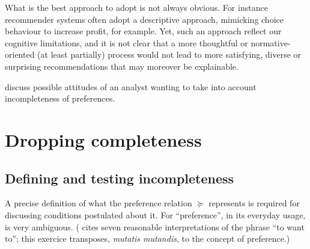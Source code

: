 \documentclass[french, english]{llncs}
\begin{document}
	What is the best approach to adopt is not always obvious. For instance recommender systems often adopt a descriptive approach, mimicking choice behaviour to increase profit, for example. Yet, such an approach reflect our cognitive limitations, and it is not clear that a more thoughtful or normative-oriented (at least partially) process would not lead to more satisfying, diverse or surprising recommendations that may moreover be explainable.
	
	
	\citet{fischhoff_knowing_1980} \citep[also]{fischhoff_knowing_1988} discuss possible attitudes of an analyst wanting to take into account incompleteness of preferences.
	

	\section{Dropping completeness}\label{sec:incomp}
	
	
	\subsection{Defining and testing incompleteness}
	\label{sec:empirical}
	A precise definition of what the preference relation $\succeq$ represents is required for discussing conditions postulated about it. For “preference”, in its everyday usage, is very ambiguous. (\citet{frankfurt_freedom_1971} cites seven reasonable interpretations of the phrase “to want to”; this exercice transposes, \emph{mutatis mutandis}, to the concept of preference.)
	
\end{document}
